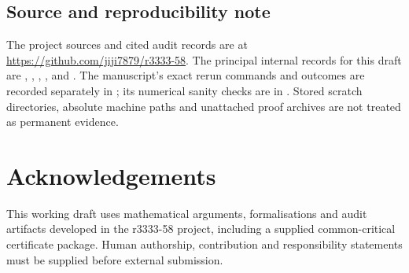 \documentclass[11pt]{article}
\theoremstyle{definition}
\theoremstyle{remark}
\begin{document}
\subsection*{Source and reproducibility note}

The project sources and cited audit records are at
\url{https://github.com/jiji7879/r3333-58}.  The principal internal records
for this draft are
,
,
,
, and
.  The manuscript's exact rerun commands and outcomes
are recorded separately in ; its numerical sanity
checks are in .  Stored scratch directories,
absolute machine paths and unattached proof archives are not treated as
permanent evidence.

\section*{Acknowledgements}

This working draft uses mathematical arguments, formalisations and audit
artifacts developed in the r3333-58 project, including a supplied
common-critical certificate package.  Human authorship, contribution and
responsibility statements must be supplied before external submission.



\end{document}

